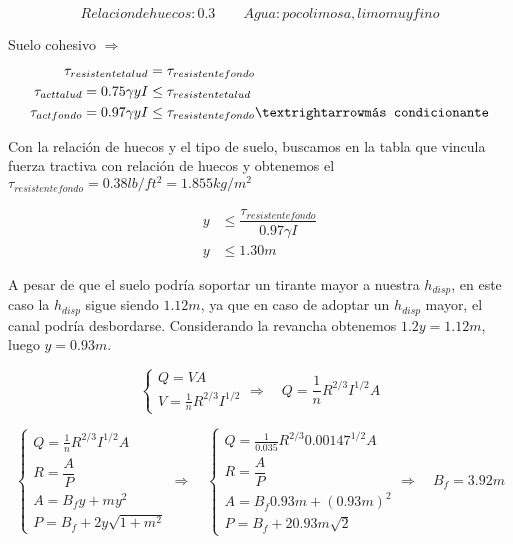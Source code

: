 \documentclass[10.5pt]{article}
\begin{document}
\begin{equation*}
  Relacion de huecos: 0.3
  \qquad
  Agua: poco limosa, limo muy fino
\end{equation*}

Suelo cohesivo $\Longrightarrow$
\begin{align*}
 \tau_{resistente talud} &= \tau_{resistente fondo} \\
 \tau_{act talud} = 0.75 \gamma y I &\leq \tau_{resistente talud} \\
 \tau_{act fondo} = 0.97 \gamma y I &\leq \tau_{resistente fondo} \textrightarrow \texttt{más condicionante}
\end{align*}

Con la relación de huecos y el tipo de suelo, buscamos en la tabla que vincula fuerza tractiva con relación de huecos y obtenemos
el $\tau_{resistente fondo} = 0.38 lb/ ft^2 = 1.855 kg/m^2$

\begin{align*}
 y &\leq \dfrac{\tau_{resistente fondo}}{0.97 \gamma I} \\
 y &\leq 1.30 m
\end{align*}

A pesar de que el suelo podría soportar un tirante mayor a nuestra $h_{disp}$, en este caso la $h_{disp}$ sigue siendo $1.12 m$, ya que en caso de adoptar 
un $h_{disp}$ mayor, el canal podría desbordarse.
Considerando la revancha obtenemos $1.2 y = 1.12 m$, luego $y = 0.93 m$.


\begin{equation*}
  \begin{cases}
    Q = V A \\
    V =  \frac{1}{n} R^{2/3} I^{1/2}
  \end{cases}
  \Longrightarrow \quad
  Q = \frac{1}{n} R^{2/3} I^{1/2} A
\end{equation*}


\begin{equation*}
  \begin{cases}
    Q = \frac{1}{n} R^{2/3} I^{1/2} A \\
    R = \dfrac{A}{P} \\
    A = B_{f}y + m y^{2} \\
    P = B_{f} + 2 y \sqrt{1 + m^{2}}
  \end{cases}
  \Longrightarrow \quad
  \begin{cases}
    Q = \frac{1}{0.035} R^{2/3} 0.00147^{1/2} A \\
    R = \dfrac{A}{P} \\
    A = B_{f}0.93 m + (0.93 m)^2 \\
    P = B_{f} + 2 0.93 m \sqrt{2}
  \end{cases}
  \Longrightarrow \quad
  B_{f} = 3.92 m
\end{equation*}
\end{document}
